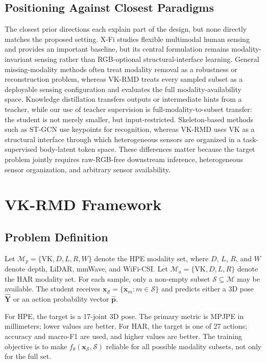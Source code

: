 ﻿\documentclass[journal]{IEEEtran}
\newcommand{\method}{VK-RMD}
\newcommand{\mpjpe}{MPJPE}
\begin{document}
\subsection{Positioning Against Closest Paradigms}
The closest prior directions each explain part of the design, but none directly matches the proposed setting. X-Fi studies flexible multimodal human sensing and provides an important baseline, but its central formulation remains modality-invariant sensing rather than RGB-optional structural-interface learning. General missing-modality methods often treat modality removal as a robustness or reconstruction problem, whereas \method{} treats every sampled subset as a deployable sensing configuration and evaluates the full modality-availability space. Knowledge distillation transfers outputs or intermediate hints from a teacher, while our use of teacher supervision is full-modality-to-subset transfer: the student is not merely smaller, but input-restricted. Skeleton-based methods such as ST-GCN use keypoints for recognition, whereas \method{} uses VK as a structural interface through which heterogeneous sensors are organized in a task-supervised body-latent token space. These differences matter because the target problem jointly requires raw-RGB-free downstream inference, heterogeneous sensor organization, and arbitrary sensor availability.

\section{VK-RMD Framework}

\subsection{Problem Definition}
Let $\mathcal{M}_{p}=\{\mathrm{VK},D,L,R,W\}$ denote the HPE modality set, where $D$, $L$, $R$, and $W$ denote depth, LiDAR, mmWave, and WiFi-CSI. Let $\mathcal{M}_{a}=\{\mathrm{VK},D,L,R\}$ denote the HAR modality set. For each sample, only a non-empty subset $\mathcal{S}\subseteq \mathcal{M}$ may be available. The student receives $\mathbf{x}_{\mathcal{S}}=\{\mathbf{x}_{m}:m\in\mathcal{S}\}$ and predicts either a 3D pose $\hat{\mathbf{Y}}$ or an action probability vector $\hat{\mathbf{p}}$.

For HPE, the target is a 17-joint 3D pose. The primary metric is \mpjpe{} in millimeters; lower values are better. For HAR, the target is one of 27 actions; accuracy and macro-F1 are used, and higher values are better. The training objective is to make $f_{\theta}(\mathbf{x}_{\mathcal{S}},\mathcal{S})$ reliable for all possible modality subsets, not only for the full set.
\end{document}
